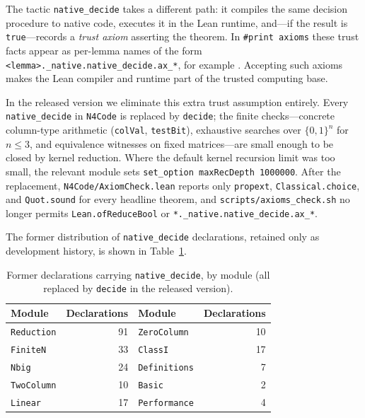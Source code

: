 \documentclass[12pt]{article}
\begin{document}
The tactic \texttt{native\_decide} takes a different path: it compiles the
same decision procedure to native code, executes it in the Lean runtime,
and---if the result is \texttt{true}---records a \emph{trust axiom}
asserting the theorem. In \texttt{\#print axioms} these trust facts appear
as per-lemma names of the form
\texttt{<lemma>.\_native.native\_decide.ax\_*}, for example
. Accepting such
axioms makes the Lean compiler and runtime part of the trusted computing
base.

In the released version we eliminate this extra trust assumption entirely.
Every \texttt{native\_decide} in \texttt{N4Code} is replaced by
\texttt{decide}; the finite checks---concrete column-type arithmetic
(\texttt{colVal}, \texttt{testBit}), exhaustive searches over
$\{0,1\}^n$ for $n\le 3$, and equivalence witnesses on fixed matrices---are
small enough to be closed by kernel reduction. Where the default kernel
recursion limit was too small, the relevant module sets
\texttt{set\_option maxRecDepth 1000000}.
After the replacement, \texttt{N4Code/AxiomCheck.lean} reports only
\texttt{propext}, \texttt{Classical.choice}, and \texttt{Quot.sound} for
every headline theorem, and \texttt{scripts/axioms\_check.sh} no longer
permits \texttt{Lean.ofReduceBool} or
\texttt{*.\_native.native\_decide.ax\_*}.

The former distribution of \texttt{native\_decide} declarations, retained
only as development history, is shown in Table~\ref{tab:native-decl}.

\begin{table}[ht]
  \centering
  \caption{Former declarations carrying \texttt{native\_decide}, by module
  (all replaced by \texttt{decide} in the released version).}
  \label{tab:native-decl}
  \small
  \begin{tabular}{@{}lrlr@{}}
  \toprule
  \textbf{Module} & \textbf{Declarations} & \textbf{Module} & \textbf{Declarations} \\
  \midrule
  \texttt{Reduction} & 91 & \texttt{ZeroColumn} & 10 \\
  \texttt{FiniteN} & 33 & \texttt{ClassI} & 17 \\
  \texttt{Nbig} & 24 & \texttt{Definitions} & 7 \\
  \texttt{TwoColumn} & 10 & \texttt{Basic} & 2 \\
  \texttt{Linear} & 17 & \texttt{Performance} & 4 \\
  \bottomrule
  \end{tabular}
  \end{table}
\end{document}
